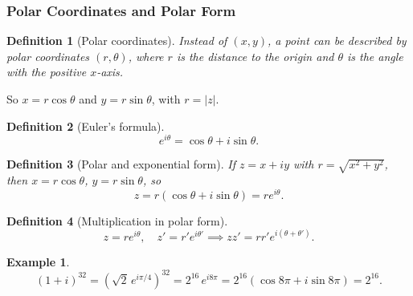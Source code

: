 \documentclass{article}
\newtheorem{definition}{Definition}
\newtheorem*{example}{Example}
\begin{document}
\subsubsection{Polar Coordinates and Polar Form}
\begin{definition}[Polar coordinates]
    Instead of $(x,y)$, a point can be described by polar coordinates $(r,\theta)$, where $r$ is the distance to the origin and $\theta$ is the angle with the positive $x$-axis.
\end{definition}
\begin{center}
\end{center}
So $x = r\cos\theta$ and $y = r\sin\theta$, with $r = |z|$.
\begin{definition}[Euler's formula]
    \begin{equation}
        \label{eq:EulerFormula}
        e^{i\theta} = \cos\theta + i\sin\theta.
    \end{equation}
\end{definition}
\begin{definition}[Polar and exponential form]
    If $z=x+iy$ with $r=\sqrt{x^2+y^2}$, then $x=r\cos\theta$, $y=r\sin\theta$, so
    \[z=r(\cos\theta+i\sin\theta)=re^{i\theta}.\]
\end{definition}
\begin{definition}[Multiplication in polar form]
    \[z = re^{i\theta}, \quad z' = r'e^{i\theta'} \implies zz' = rr'e^{i(\theta + \theta')}.\]
\end{definition}
\begin{example}
    \[(1 + i)^{32} = (\sqrt{2}\,e^{i\pi/4})^{32} = 2^{16}\,e^{i8\pi} = 2^{16}(\cos 8\pi + i \sin 8\pi) = 2^{16}.\]
\end{example}
\end{document}
